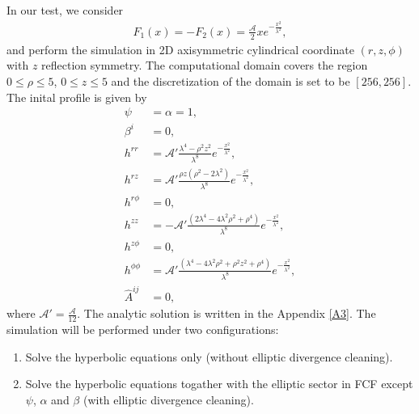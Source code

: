 In our test, we consider 
\begin{align}
    F_1 (x) = - F_2 (x) = \frac{\mathcal{A}}{2} x e^{-\frac{x^2}{\lambda^2}},
\end{align}
and perform the simulation in 2D axisymmetric cylindrical coordinate $(r,z,\phi)$ with $z$ reflection symmetry.
The computational domain covers the region $0\leq \rho \leq 5$, $0\leq z \leq 5$
and the discretization of the domain is set to be $[256,256]$.
The inital profile is given by
\begin{align}\label{eq:Teukolsky_wave_IC}
    \psi &= \alpha = 1, \\
    \beta^i &= 0, \\
    h^{rr} &= \mathcal{A}' \frac{\lambda^4 - \rho^2 z^2}{\lambda^8} e^{-\frac{x^2}{\lambda^2}}, \\
    h^{r z} &= \mathcal{A}' \frac{\rho z \left(\rho^2 - 2 \lambda^2 \right)}{\lambda^8} e^{-\frac{x^2}{\lambda^2}}, \\
    h^{r \phi} &= 0, \\
    h^{zz} &= - \mathcal{A}' \frac{\left(2 \lambda^4 - 4 \lambda^2 \rho^2 + \rho^4 \right)}{\lambda^8} e^{-\frac{x^2}{\lambda^2}}, \\
    h^{z\phi} &= 0, \\
    h^{\phi\phi} &= \mathcal{A}' \frac{\left(\lambda^4 - 4 \lambda^2 \rho^2 +\rho^2 z^2 + \rho^4 \right)}{\lambda^8} e^{-\frac{x^2}{\lambda^2}}, \\
    \hat{A}^{ij} &= 0,
\end{align}
where $\mathcal{A}' = \frac{\mathcal{A}}{12}$.
The analytic solution is written in the Appendix \ref{A3}.
The simulation will be performed under two configurations:
\begin{enumerate}
    \item Solve the hyperbolic equations only (without elliptic divergence cleaning).
    \label{TW_config_1}
    \item Solve the hyperbolic equations togather with the elliptic sector in FCF except $\psi$, $\alpha$ and $\beta$ (with elliptic divergence cleaning).
    \label{TW_config_2}
\end{enumerate}
